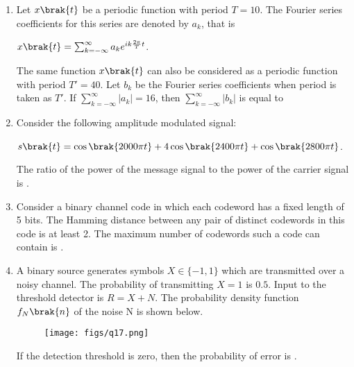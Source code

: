 \documentclass[a4paper, 11pt]{article}
\begin{document}
\begin{enumerate}
    \hfill{}
    
    \item Let $x\brak{t}$ be a periodic function with period $T=10$. The Fourier series coefficients for this series are denoted by $a_k$, that is
    \begin{center}
        $x\brak{t} = \sum_{k=-\infty}^{\infty} a_k e^{ik\frac{2\pi}{T}t}$. 
    \end{center}
    The same function $x\brak{t}$ can also be considered as a periodic function with period $T' = 40$. Let $b_k$ be the Fourier series coefficients when period is taken as $T'$. If $\sum_{k=-\infty}^{\infty} |a_k| = 16$, then $\sum_{k=-\infty}^{\infty} |b_k|$ is equal to
    \begin{enumerate}
    \end{enumerate}

    \hfill{}

    \item Consider the following amplitude modulated signal: 
    \begin{center}
    $s\brak{t} = \cos\brak{2000\pi t} + 4\cos\brak{2400\pi t} + \cos\brak{2800\pi t}$. 
    \end{center}
    The ratio  of the power of the message signal to the power of the carrier signal is \underline{\hspace{2cm}}.

    \hfill{}
    
    \item Consider a binary channel code in which each codeword has a fixed length of 5 bits. The Hamming distance between any pair of distinct codewords in this code is at least 2. The maximum number of codewords such a code can contain is \underline{\hspace{2cm}}.

    \hfill{}

    \item A binary source generates symbols $X \in \{-1, 1\}$ which are transmitted over a noisy channel. The probability of transmitting $X=1$ is $0.5$. Input to the threshold detector is $R = X + N$. The probability density function $f_N\brak{n}$ of the noise N is shown below.
    \begin{figure}[H]
        \centering
        \texttt{[image: figs/q17.png]}
        \caption*{}
        \label{fig:q17}
    \end{figure}
    If the detection threshold is zero, then the probability of error  is \underline{\hspace{2cm}}.


\end{enumerate}
\end{document}
